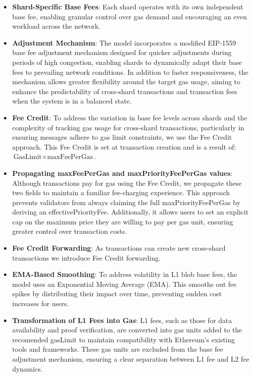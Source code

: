 \begin{itemize}
    \item \textbf{Shard-Specific Base Fees}: Each shard operates with its own independent base fee, enabling granular control over gas demand and encouraging an even workload across the network.

    \item \textbf{Adjustment Mechanism}: The model incorporates a modified EIP-1559 base fee adjustment mechanism designed for quicker adjustments during periods of high congestion, enabling shards to dynamically adapt their base fees to prevailing network conditions. In addition to faster responsiveness, the mechanism allows greater flexibility around the target gas usage, aiming to enhance the predictability of cross-shard transactions and transaction fees when the system is in a balanced state.

    \item \textbf{Fee Credit}: To address the variation in base fee levels across shards and the complexity of tracking gas usage for cross-shard transactions, particularly in ensuring messages adhere to gas limit constraints, we use the Fee Credit approach. This Fee Credit is set at transaction creation and is a result of:  \( \text{GasLimit} \times \text{maxFeePerGas} \).
    
    \item \textbf{Propagating maxFeePerGas and maxPriorityFeePerGas values}: Although transactions pay for gas using the Fee Credit, we propagate these two fields to maintain a familiar fee-charging experience. This approach prevents validators from always claiming the full maxPriorityFeePerGas by deriving an effectivePriorityFee. Additionally, it allows users to set an explicit cap on the maximum price they are willing to pay per gas unit, ensuring greater control over transaction costs.
    
    \item \textbf{Fee Credit Forwarding}: As transactions can create new cross-shard transactions we introduce Fee Credit forwarding. 
    
    \item \textbf{EMA-Based Smoothing}: To address volatility in L1 blob base fees, the model uses an Exponential Moving Average (EMA). This smooths out fee spikes by distributing their impact over time, preventing sudden cost increases for users.

    \item \textbf{Transformation of L1 Fees into Gas}: L1 fees, such as those for data availability and proof verification, are converted into gas units added to the recomended gasLimit to maintain compatibility with Ethereum’s existing tools and frameworks.  These gas units are excluded from the base fee adjustment mechanism, ensuring a clear separation between L1 fee and L2 fee dynamics.
\end{itemize}